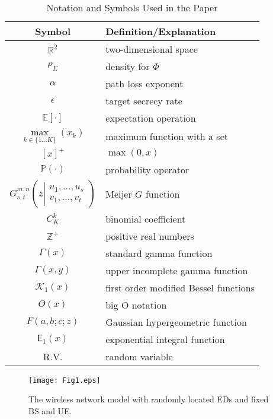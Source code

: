 \documentclass[10pt]{IEEEtran}
\begin{document}
\begin{table}[!t]\small
\centering
\caption{Notation and Symbols Used in the Paper}
\begin{tabular}{|c|l|}
\hline
   Symbol             &Definition/Explanation         \\ \hline
$\mathbb R^2$         &   two-dimensional space       \\
$\rho_E$              &   density for $\Phi$          \\
$\alpha$              &   path loss exponent          \\
$\epsilon$            &   target secrecy rate         \\
$\mathbb E[\cdot]$    &   expectation operation       \\
$\underset{k\in \{1...K\}}{\max}\left(x_k\right)$              &   maximum function with a set        \\
$[x]^+$               &   $\max(0,x)$                 \\
$\mathbb{P}(\cdot)$   &   probability operator        \\
$G_{s,t}^{m,n}\left(z\left|
\begin{array}{c}
  u_1,\ldots,u_s \\
  v_1,\ldots,v_t
\end{array}
\right.
\right)$              &   Meijer $G$ function         \\
$C^{k}_{K}$           &   binomial coefficient        \\
$\mathbb{Z}^+$        &   positive real numbers       \\
$\Gamma(x)$           &   standard gamma function     \\
$\Gamma(x,y)$         &   upper incomplete gamma function  \\
$\mathcal K_1(x)$     &   first order modified Bessel functions   \\
$O\left(x\right)$     &   big O notation              \\
$F(a,b;c;z)$          &   Gaussian hypergeometric function          \\
$\mathsf{E}_1(x)$     &   exponential integral function          \\
R.V.                &   random variable             \\ \hline
\end{tabular}
\end{table}

\begin{figure}[t]
  \centering
  \centerline{\texttt{[image: Fig1.eps]}}
 \caption{The wireless network model with randomly located EDs and fixed BS and UE.} \label{fig:symodl}
\end{figure}
\end{document}
